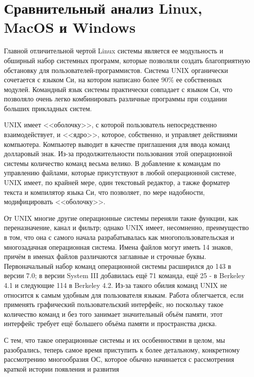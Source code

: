 \section{Сравнительный анализ Linux, MacOS и Windows}

Главной отличительной чертой Linux системы является ее модульность и обширный набор системных программ, которые позволяли создать благоприятную обстановку для пользователей-программистов. Система UNIX органически сочетается с языком Си, на котором написано более 90\% ее собственных модулей. Командный язык системы практически совпадает с языком Си, что позволяло очень легко комбинировать различные программы при создании больших прикладных систем.

UNIX имеет <<оболочку>>, с которой пользователь непосредственно взаимодействует, и <<ядро>>, которое, собственно, и управляет действиями компьютера. Компьютер выводит в качестве приглашения для ввода команд долларовый знак. Из-за продолжительности пользования этой операционной системы количество команд весьма велико. В добавление к командам по управлению файлами, которые присутствуют в любой операционной системе, UNIX имеет, по крайней мере, один текстовый редактор, а также форматер текста и компилятор языка Си, что позволяет, по мере надобности, модифицировать <<оболочку>>.

От UNIX многие другие операционные системы переняли такие функции, как переназначение, канал и фильтр; однако UNIX имеет, несомненно, преимущество в том, что она с самого начала разрабатывалась как многопользовательская и многозадачная операционная система. Имена файлов могут иметь 14 знаков, причём в именах файлов различаются заглавные и строчные буквы. Первоначальный набор команд операционной системы расширился до 143 в версии 7.0; в версии System III добавилась ещё 71 команда, ещё 25 - в Berkeley 4.1 и следующие 114 в Berkeley 4.2. Из-за такого обилия команд UNIX не относится к самым удобным для пользователя языкам. Работа облегчается, если применять графический пользовательский интерфейс, но поскольку такое количество команд и без того занимает значительный объём памяти, этот интерфейс требует ещё большего объёма памяти и пространства диска.

С тем, что такое операционные системы и их особенностями в целом, мы разобрались, теперь самое время приступить к более детальному, конкретному рассмотрению многообразия ОС, которое обычно начинается с рассмотрения краткой истории появления и развития

